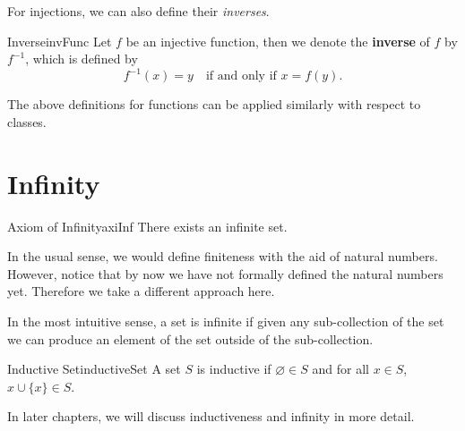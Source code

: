 \documentclass[math]{amznotes}
\theoremstyle{remark}
\begin{document}
For injections, we can also define their \textit{inverses}.
\begin{dfnbox}{Inverse}{invFunc}
    Let $f$ be an injective function, then we denote the {\color{red} \textbf{inverse}} of $f$ by $f^{-1}$, which is defined by
    \begin{displaymath}
        f^{-1}(x) = y \quad \textrm{if and only if } x = f(y). 
    \end{displaymath}
\end{dfnbox}
The above definitions for functions can be applied similarly with respect to classes.
\section{Infinity}
\begin{axibox}{Axiom of Infinity}{axiInf}
    There exists an infinite set.
\end{axibox}
In the usual sense, we would define finiteness with the aid of natural numbers. However, notice that by now we have not formally defined the natural numbers yet. Therefore we take a different approach here.

In the most intuitive sense, a set is infinite if given any sub-collection of the set we can produce an element of the set outside of the sub-collection.
\begin{dfnbox}{Inductive Set}{inductiveSet}
    A set $S$ is inductive if $\varnothing \in S$ and for all $x \in S$, $x \cup \{x\} \in S$.
\end{dfnbox}
In later chapters, we will discuss inductiveness and infinity in more detail.
\end{document}
